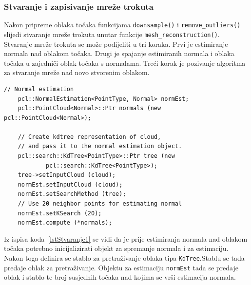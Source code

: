 
\newpage
\subsubsection{Stvaranje i zapisivanje mreže trokuta} %
\label{ssub:Stvaranje i zapisivanje mreže trokuta}

Nakon pripreme oblaka točaka funkcijama \texttt{downsample()} i
\texttt{remove\_outliers()} slijedi stvaranje mreže trokuta unutar
funkcije \texttt{mesh\_reconstruction()}. Stvaranje mreže trokuta se
može podijeliti u tri koraka. Prvi je estimiranje normala nad oblakom
točaka. Drugi je spajanje estimiranih normala i oblaka točaka u
zajedniči oblak točaka s normalama. Treći korak je pozivanje algoritma
za stvaranje mreže nad novo stvorenim oblakom.

\begin{lstlisting}[label=lstStvaranje1, caption={Dio izvornog koda za
    estimaciji normala iz funkcije \texttt{reconstruct\_mesh()} }]
    // Normal estimation
    pcl::NormalEstimation<PointType, Normal> normEst;
    pcl::PointCloud<Normal>::Ptr normals (new pcl::PointCloud<Normal>);
    
    // Create kdtree representation of cloud, 
    // and pass it to the normal estimation object. 
    pcl::search::KdTree<PointType>::Ptr tree (new
            pcl::search::KdTree<PointType>);
    tree->setInputCloud (cloud);
    normEst.setInputCloud (cloud);
    normEst.setSearchMethod (tree);
    // Use 20 neighbor points for estimating normal
    normEst.setKSearch (20);
    normEst.compute (*normals);
\end{lstlisting}

Iz ispisa koda~\ref{lstStvaranje1} se vidi da je prije estimiranja
normala nad oblakom točaka potrebno inicijalizirati objekt za
spremanje normala i za estimaciju. Nakon toga definira se
stablo za pretraživanje oblaka tipa \texttt{KdTree}.\footnotemark[1]
Stablu se tada predaje oblak za pretraživanje. Objektu za
estimaciju \texttt{normEst} tada se predaje oblak i stablo te broj
susjednih točaka nad kojima se vrši estimacija
normala\footnotemark[2]. 


